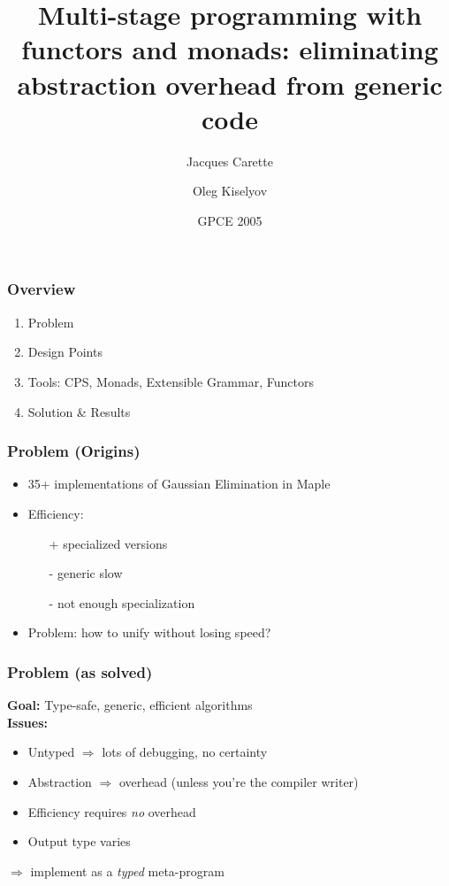 \documentclass{beamer}
\title{Multi-stage programming with functors and monads:
eliminating abstraction overhead from generic code}
\author{Jacques Carette\inst{1} \and
Oleg Kiselyov\inst{2}}
\institute{\inst{1}McMaster University \inst{2} FNMOC}
\date{GPCE 2005}
\begin{document}
\divide{}
\divide{}
\divide{}
\divide{}

\newcommand{\seq}[1]{{\langle #1 \rangle}}
\newcommand{\set}[1]{{\{ #1 \}}}
\newcommand{\tuple}[1]{{( #1 )}}
\newcommand{\mname}[1]{\mbox{\sf #1}}
\newcommand{\Nat}{\mathbb N}

\begin{frame}
\titlepage
\end{frame}

\begin{frame}
\frametitle{Overview}
\begin{enumerate}
    \item Problem
    \item Design Points
    \item Tools: CPS, Monads, Extensible Grammar, Functors
    \item Solution \& Results
\end{enumerate}
\end{frame}

\begin{frame}
\frametitle{Problem (Origins)}
    \begin{itemize}
        \item 35+ implementations of Gaussian Elimination in Maple
        \item Efficiency:
            \begin{itemize}
                \item[+] specialized versions 
                \item[-] generic slow
                \item[-] not enough specialization
            \end{itemize}
        \item Problem: how to unify without losing speed?
    \end{itemize}
\end{frame}

\begin{frame}
    \frametitle{Problem (as solved)}
    \textbf{Goal:} Type-safe, generic, efficient algorithms\\
    \textbf{Issues:}
    \begin{itemize}
        \item Untyped $\Rightarrow$ lots of debugging, no certainty
        \item Abstraction $\Rightarrow$ overhead 
            (unless you're the compiler writer)
        \item Efficiency requires \emph{no} overhead
        \item Output type varies
    \end{itemize}
    $\Longrightarrow$ implement as a \emph{typed} meta-program
\end{frame}
\end{document}
